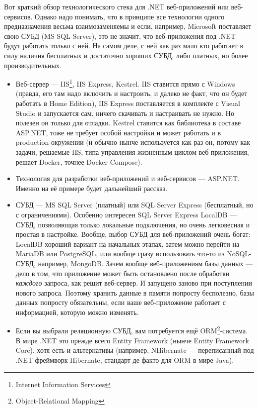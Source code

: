\documentclass[a5paper]{article}
\begin{document}
Вот краткий обзор технологического стека для .NET веб-приложений или веб-сервисов. Однако надо понимать, что в принципе все технологии одного предназначения весьма взаимозаменяемы и если, например, Microsoft поставляет свою СУБД (MS SQL Server), это не значит, что веб-приложения под .NET будут работать только с ней. На самом деле, с ней как раз мало кто работает в силу наличия бесплатных и достаточно хороших СУБД, либо платных, но более производительных.

\begin{itemize}
    \item Веб-сервер --- IIS\footnote{Internet Information Services}, IIS Express, Kestrel. IIS ставится прямо с Windows (правда, его там надо включить и настроить, и далеко не факт, что он будет работать в Home Edition), IIS Express поставляется в комплекте с Visual Studio и запускается сам, ничего скачивать и настраивать не нужно. Но полезен он только для отладки. Kestrel ставится как библиотека в составе ASP.NET, тоже не требует особой настройки и может работать и в production-окружении (и обычно нынче используется как раз он, потому как задачи, решаемые IIS, типа управления жизненным циклом веб-приложения, решает Docker, точнее Docker Compose).
    \item Технология для разработки веб-приложений и веб-сервисов --- ASP.NET. Именно на её примере будет дальнейший рассказ.
    \item СУБД --- MS SQL Server (платный) или SQL Server Express (бесплатный, но с ограничениями). Особенно интересен SQL Server Express LocalDB --- СУБД, позволяющая только локальные подключения, но очень легковесная и простая в настройке. Вообще, выбор СУБД для веб-приложений очень богат: LocalDB хороший вариант на начальных этапах, затем можно перейти на MariaDB или PostgreSQL, или вообще сразу использовать что-то из NoSQL-СУБД, например, MongoDB. Зачем вообще веб-приложениям базы данных --- дело в том, что приложение может быть остановлено после обработки \emph{каждого} запроса, как решит веб-сервер. И запущено заново при поступлении нового запроса. Поэтому хранить данные в памяти попросту бесполезно, базы данных попросту обязательны, если ваше веб-приложение работает с информацией, которую можно изменять.
    \item Если вы выбрали реляционную СУБД, вам потребуется ещё ORM\footnote{Object-Relational Mapping}-система. В мире .NET это прежде всего Entity Framework (нынче Entity Framework Core), хотя есть и альтернативы (например, NHibernate --- переписанный под .NET фреймворк Hibernate, стандарт де-факто для ORM в мире Java).

\end{itemize}
\end{document}
